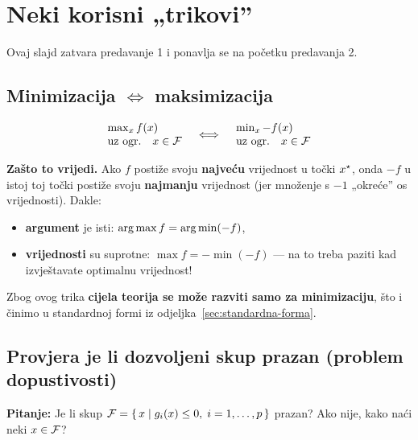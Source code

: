 \section{Neki korisni „trikovi”}
\label{sec:trikovi}

Ovaj slajd zatvara predavanje 1 i ponavlja se na početku predavanja 2.

\subsection{Minimizacija $\Leftrightarrow$ maksimizacija}

\begin{equation}
\begin{array}{ccc}
\begin{array}{l}
\max_x f(x) \\ \text{uz ogr.} \quad x \in \mathcal{F}
\end{array}
& \Longleftrightarrow &
\begin{array}{l}
\min_x -f(x) \\ \text{uz ogr.} \quad x \in \mathcal{F}
\end{array}
\end{array}
\end{equation}

\textbf{Zašto to vrijedi.} Ako $f$ postiže svoju \textbf{najveću} vrijednost u
točki $x^{\star}$, onda $-f$ u istoj toj točki postiže svoju \textbf{najmanju}
vrijednost (jer množenje s $-1$ „okreće” os vrijednosti). Dakle:

\begin{itemize}
  \item \textbf{argument} je isti: $\operatorname*{arg\,max} f = \operatorname*{arg\,min} (-f)$,
  \item \textbf{vrijednosti} su suprotne: $\max f = -\min(-f)$ --- na to treba
        paziti kad izvještavate optimalnu vrijednost!
\end{itemize}

Zbog ovog trika \textbf{cijela teorija se može razviti samo za minimizaciju},
što i činimo u standardnoj formi iz odjeljka~\ref{sec:standardna-forma}.

\subsection{Provjera je li dozvoljeni skup prazan (problem dopustivosti)}

\textbf{Pitanje:} Je li skup $\mathcal{F} = \{\, x \mid g_i(x) \le 0,\;
i = 1,\dots,p \,\}$ prazan? Ako nije, kako naći neki $x \in \mathcal{F}$?

